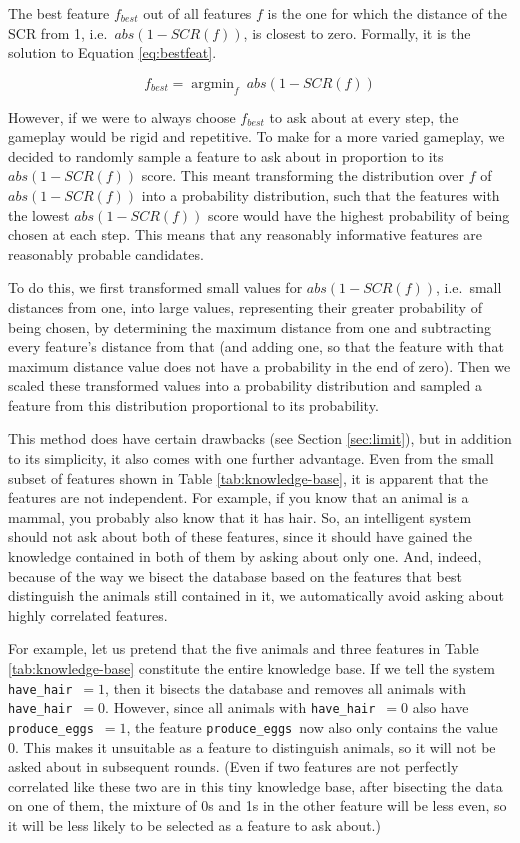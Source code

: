 \documentclass[11pt,a4paper]{article}
\DeclareMathOperator*{\argmin}{argmin}
\newcommand{\havehair}{\texttt{have\_hair}}
\newcommand{\produceeggs}{\texttt{produce\_eggs}}
\begin{document}
The best feature $f_{best}$ out of all features $f$ is the one for which the distance of the SCR from 1, i.e.\ $abs(1 - SCR(f))$, is closest to zero.
Formally, it is the solution to Equation \ref{eq:bestfeat}.

\begin{equation}
f_{best} = \argmin_f\ abs(1 - SCR(f)) 
\label{eq:bestfeat}
\end{equation}

However, if we were to always choose $f_{best}$ to ask about at every step, the gameplay would be rigid and repetitive.
To make for a more varied gameplay, we decided to randomly sample a feature to ask about in proportion to its $abs(1 - SCR(f))$ score. 
This meant transforming the distribution over $f$ of $abs(1 - SCR(f))$ into a probability distribution, such that the features with the lowest $abs(1 - SCR(f))$ score would have the highest probability of being chosen at each step.
This means that any reasonably informative features are reasonably probable candidates.

To do this, we first transformed small values for $abs(1 - SCR(f))$, i.e.\ small distances from one, into large values, representing their greater probability of being chosen, by determining the maximum distance from one and subtracting every feature's distance from that (and adding one, so that the feature with that maximum distance value does not have a probability in the end of zero).
Then we scaled these transformed values into a probability distribution and sampled a feature from this distribution proportional to its probability.

This method does have certain drawbacks (see Section \ref{sec:limit}), but in addition to its simplicity, it also comes with one further advantage.
Even from the small subset of features shown in Table \ref{tab:knowledge-base}, it is apparent that the features are not independent.
For example, if you know that an animal is a mammal, you probably also know that it has hair.
So, an intelligent system should not ask about both of these features, since it should have gained the knowledge contained in both of them by asking about only one.
And, indeed, because of the way we bisect the database based on the features that best distinguish the animals still contained in it, we automatically avoid asking about highly correlated features.

For example, let us pretend that the five animals and three features in Table \ref{tab:knowledge-base} constitute the entire knowledge base.
If we tell the system \havehair\ $= 1$, then it bisects the database and removes all animals with \havehair\ $= 0$.
However, since all animals with \havehair\ $= 0$ also have \produceeggs\ $= 1$, the feature \produceeggs\ now also only contains the value 0.
This makes it unsuitable as a feature to distinguish animals, so it will not be asked about in subsequent rounds.
(Even if two features are not perfectly correlated like these two are in this tiny knowledge base, after bisecting the data on one of them, the mixture of 0s and 1s in the other feature will be less even, so it will be less likely to be selected as a feature to ask about.)
\end{document}
